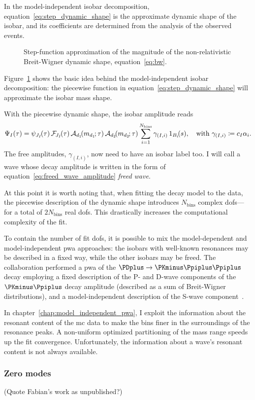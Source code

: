     In the model-independent isobar decomposition, equation~\eqref{eq:step_dynamic_shape} is the approximate dynamic shape of the isobar, and its coefficients are determined from the analysis of the observed events.
    \begin{figure}
        \centering
        
        \caption{Step-function approximation of the magnitude of the non-relativistic Breit-Wigner dynamic shape, equation~\eqref{eq:bw}.}
        \label{fig:step_function_approximation}
    \end{figure}
    Figure~\ref{fig:step_function_approximation} shows the basic idea behind the model-independent isobar decomposition: the piecewise function in equation~\eqref{eq:step_dynamic_shape} will approximate the isobar mass shape.


    With the piecewise dynamic shape, the isobar amplitude reads
    \begin{equation}\label{eq:freed_wave_amplitude}
        \Psi_I(\tau) = \psi_{J_I\!}(\tau)\,\mathcal{F\!}_{J_I\!}(\tau)\,\A_{d_1}\!(m_{d_1\!}; \tau)\,\A_{d_2}\!(m_{d_2\!}; \tau) \sum_{i=1}^{N_\text{bins}} \gamma_{(I,i)}\, \Characteristic_{B_i}\!(s),
        \quad
        \text{with }
        \gamma_{(I,i)} \coloneqq c_I \alpha_i. 
    \end{equation}
    The free amplitudes, $\gamma_{(I,i)}$, now need to have an isobar label too.
    I will call a wave whose decay amplitude is written in the form of equation~\eqref{eq:freed_wave_amplitude} \emph{freed wave}.


    At this point it is worth noting that, when fitting the decay model to the data, the piecewise description of the dynamic shape introduces $N_\text{bins}$ complex \acp{dof}---for a total of $2N_{\text{bins}}$ real \acp{dof}.
    This drastically increases the computational complexity of the fit.


    To contain the number of fit \acp{dof}, it is possible to mix the model-dependent and model-independent \ac{pwa} approaches: the isobars with well-known resonances may be described in a fixed way, while the other isobars may be freed.
    The \focus{} collaboration performed a \ac{pwa} of the $\PDplus \to \PKminus\Ppiplus\Ppiplus$ decay employing a fixed description of the P- and D-wave components of the $\PKminus\Ppiplus$ decay amplitude (described as a sum of Breit-Wigner distributions), and a model-independent description of the S-wave component~\cite{Link200914}.


    In chapter~\ref{chap:model_independent_pwa}, I exploit the information about the resonant content of the \ac{mc} data to make the bins finer in the surroundings of the resonance peaks.
    A non-uniform optimized partitioning of the mass range speeds up the fit convergence.
    Unfortunately, the information about a wave's resonant content is not always available.


        \subsubsection{Zero modes}
        

    {\color{red}
    (Quote Fabian's work as unpublished?)
    }
